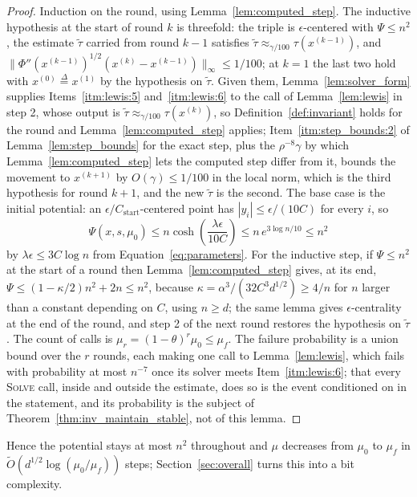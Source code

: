 \documentclass[11pt]{article}
\renewcommand{\O}{\widetilde O}
\newcommand{\tautil}{\widetilde{\tau}}
\newcommand{\defeq}{\stackrel{\Delta}{=}}
\begin{document}
\begin{proof}
Induction on the round, using Lemma~\ref{lem:computed_step}.
The inductive hypothesis at the start of round $k$ is threefold: the triple is
$\epsilon$-centered with
$\Psi \le n^{2}$, the estimate
$\tautil$ carried from round
$k - 1$ satisfies
$\tautil \approx_{\gamma / 100} \tau(x^{(k - 1)})$, and
$\|\Phi''(x^{(k - 1)})^{1/2} (x^{(k)} - x^{(k - 1)})\|_{\infty} \le 1 / 100$; at
$k = 1$ the last two hold with
$x^{(0)} \defeq x^{(1)}$ by the hypothesis on
$\tautil$.
Given them, Lemma~\ref{lem:solver_form} supplies Items~\ref{itm:lewis:5}
and~\ref{itm:lewis:6} to the call of Lemma~\ref{lem:lewis} in step 2, whose
output is $\tautil \approx_{\gamma / 100} \tau(x^{(k)})$, so
Definition~\ref{def:invariant} holds for the round and
Lemma~\ref{lem:computed_step} applies; Item~\ref{itm:step_bounds:2} of
Lemma~\ref{lem:step_bounds} for the exact step, plus the $\rho^{-8} \gamma$ by
which Lemma~\ref{lem:computed_step} lets the computed step differ from it,
bounds the movement to $x^{(k + 1)}$ by
$O(\gamma) \le 1 / 100$ in the local norm, which is the third hypothesis for
round $k + 1$, and the new
$\tautil$ is the second.
The base case is the initial potential: an
$\epsilon / C_{\mathrm{start}}$-centered point has
$|y_i| \le \epsilon / (10 C)$ for every
$i$, so
\[
\Psi(x, s, \mu_0)
\le
n \cosh\left( \frac{\lambda \epsilon}{10 C} \right)
\le
n \, e^{3 \log n / 10}
\le
n^{2}
\]
by $\lambda \epsilon \le 3 C \log n$ from Equation~\eqref{eq:parameters}.
For the inductive step, if $\Psi \le n^{2}$ at the start of a round then
Lemma~\ref{lem:computed_step} gives, at its end,
$\Psi \le (1 - \kappa / 2) n^{2} + 2 n \le n^{2}$, because
$\kappa = \alpha^{3} / (32 C^{3} d^{1/2}) \ge 4 / n$ for
$n$ larger than a constant depending on
$C$, using
$n \ge d$; the same lemma gives
$\epsilon$-centrality at the end of the round, and step 2 of the next round
restores the hypothesis on $\tautil$.
The count of calls is $\mu_r = (1 - \theta)^{r} \mu_0 \le \mu_f$.
The failure probability is a union bound over the $r$ rounds, each making one
call to Lemma~\ref{lem:lewis}, which fails with probability at most $n^{-7}$
once its solver meets Item~\ref{itm:lewis:6}; that every \textsc{Solve} call,
inside and outside the estimate, does so is the event conditioned on in the
statement, and its probability is the subject of
Theorem~\ref{thm:inv_maintain_stable}, not of this lemma.
\end{proof}

Hence the potential stays at most $n^{2}$ throughout and
$\mu$ decreases from
$\mu_0$ to
$\mu_f$ in
$\O(d^{1/2} \log(\mu_0 / \mu_f))$ steps; Section~\ref{sec:overall} turns this
into a bit complexity.
\end{document}
